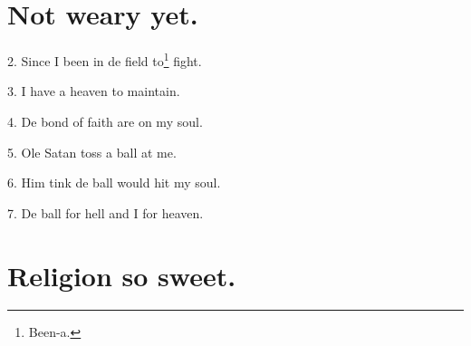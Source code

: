 \documentclass[a5paper,10pt]{book}
\begin{document}
\newpage
\section{Not weary yet.}
\thispagestyle{empty}

\begin{song}

\end{song}

\begin{stanza}
\item[2.]
  Since I been in de field to\footnote[2]{Been-a.} fight.

\item[3.]
  I have a heaven to maintain.

\item[4.]
  De bond of faith are on my soul.

\item[5.]
  Ole Satan toss a ball at me.

\item[6.]
  Him tink de ball would hit my soul.

\item[7.]
  De ball for hell and I for heaven.
\end{stanza}


\newpage
\section{Religion so sweet.}
\thispagestyle{empty}

\begin{song}
\end{song}
\end{document}
